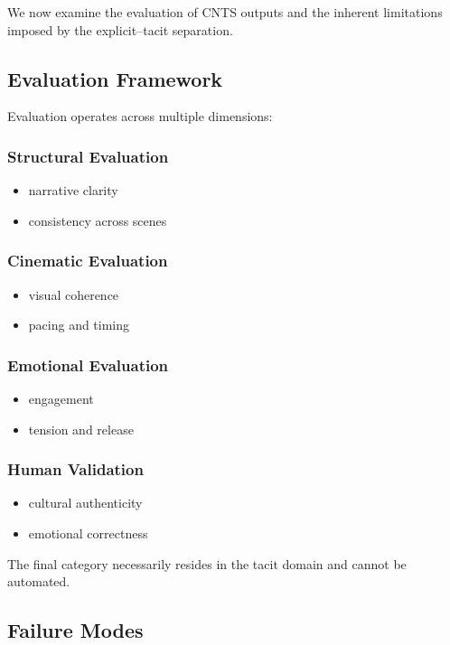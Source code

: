 \documentclass[preprints,article,submit,pdftex,moreauthors,accept]{Definitions/mdpi}
\begin{document}
We now examine the evaluation of CNTS outputs and the inherent limitations imposed by the explicit–tacit separation.

\subsection{Evaluation Framework}

Evaluation operates across multiple dimensions:

\subsubsection{Structural Evaluation}
\begin{itemize}
    \item narrative clarity
    \item consistency across scenes
\end{itemize}

\subsubsection{Cinematic Evaluation}
\begin{itemize}
    \item visual coherence
    \item pacing and timing
\end{itemize}

\subsubsection{Emotional Evaluation}
\begin{itemize}
    \item engagement
    \item tension and release
\end{itemize}

\subsubsection{Human Validation}
\begin{itemize}
    \item cultural authenticity
    \item emotional correctness
\end{itemize}

The final category necessarily resides in the tacit domain and cannot be automated.

\subsection{Failure Modes}
\end{document}
